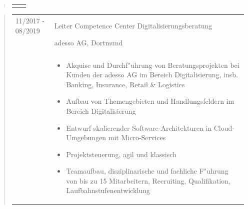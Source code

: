 \begin{quote}
\begin{tabular}{p{4cm}l}
\begin{minipage}{10cm}
			\end{minipage}
		\end{tabular}
	\end{quote}
	\begin{quote}
		\begin{tabular}{p{4cm}l}
			11/2017 - 08/2019&Leiter Competence Center Digitalisierungsberatung\\
			&adesso AG, Dortmund\\
			\\
			&\begin{minipage}{10cm}
                \begin{itemize}
                    \item Akquise und Durchf"uhrung von Beratungsprojekten bei Kunden der adesso AG im Bereich Digitalisierung, insb. Banking, Insurance,                               Retail \& Logistics
                    \item Aufbau von Themengebieten und Handlungsfeldern im Bereich Digitalisierung
                    \item Entwurf skalierender Software-Architekturen in Cloud-Umgebungen mit Micro-Services
                    \item Projektsteuerung, agil und klassisch
                    \item Teamaufbau, disziplinarische und fachliche F"uhrung von bis zu 15 Mitarbeitern, Recruiting, Qualifikation,                                                   Laufbahn\-stufenentwicklung
                \end{itemize}
				

\end{minipage}
\end{tabular}
\end{quote}
